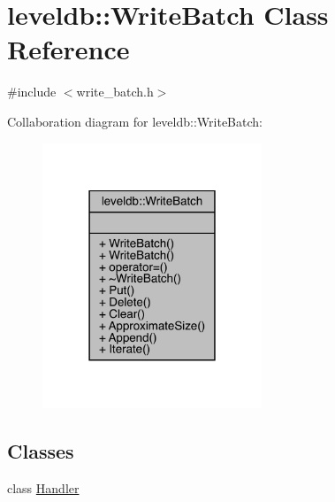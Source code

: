 \hypertarget{classleveldb_1_1_write_batch}{}\section{leveldb\+::Write\+Batch Class Reference}
\label{classleveldb_1_1_write_batch}


{\ttfamily \#include $<$write\+\_\+batch.\+h$>$}



Collaboration diagram for leveldb\+::Write\+Batch\+:
\nopagebreak
\begin{figure}[H]
\begin{center}
\leavevmode
\includegraphics[width=186pt]{classleveldb_1_1_write_batch__coll__graph}
\end{center}
\end{figure}
\subsection*{Classes}
\begin{DoxyCompactItemize}
\item 
class \mbox{\hyperlink{classleveldb_1_1_write_batch_1_1_handler}{Handler}}
\end{DoxyCompactItemize}
